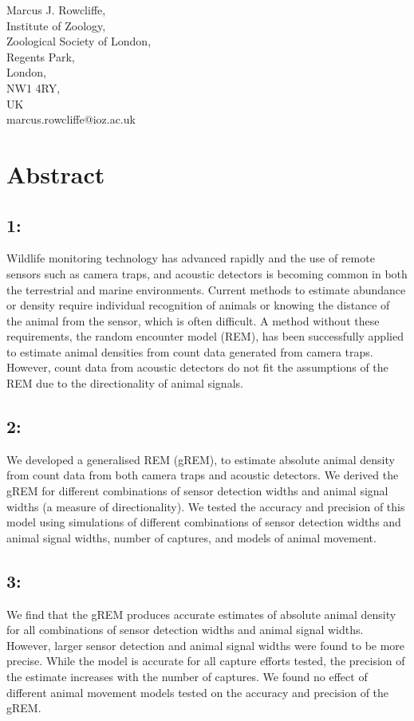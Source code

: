 \documentclass[a4paper,10pt,reqno,oneside]{amsart}
\begin{document}
Marcus J. Rowcliffe, \\
Institute of Zoology, \\
Zoological Society of London, \\
Regents Park, \\
London, \\
NW1 4RY, \\
UK \\
marcus.rowcliffe@ioz.ac.uk


\clearpage



\section*{Abstract}
\subsection*{1:}  Wildlife monitoring technology has advanced rapidly and the use of remote sensors such as camera traps, and acoustic detectors is becoming common in both the terrestrial and marine environments. Current methods to estimate abundance or density require individual recognition of animals or knowing the distance of the animal from the sensor, which is often difficult. A method without these requirements, the random encounter model (REM), has been successfully applied to estimate animal densities from count data generated from camera traps. However, count data from acoustic detectors do not fit the assumptions of the REM due to the directionality of animal signals.

\subsection*{2:} We developed a generalised REM (gREM), to estimate absolute animal density from count data from both camera traps and acoustic detectors. We derived the gREM for different combinations of sensor detection widths and animal signal widths (a measure of directionality). We tested the accuracy and precision of this model using simulations of different combinations of sensor detection widths and animal signal widths, number of captures, and models of animal movement. 

\subsection*{3:} We find that the gREM produces accurate estimates of absolute animal density for all combinations of sensor detection widths and animal signal widths. However, larger sensor detection and animal signal widths were found to be more precise. While the model is accurate for all capture efforts tested, the precision of the estimate increases with the number of captures. We found no effect of different animal movement models tested on the accuracy and precision of the gREM.  
\end{document}

